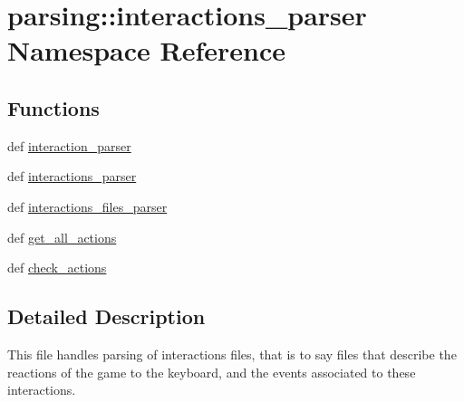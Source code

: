 \hypertarget{namespaceparsing_1_1interactions__parser}{\section{parsing\-:\-:interactions\-\_\-parser \-Namespace \-Reference}
\label{namespaceparsing_1_1interactions__parser}
}
\subsection*{\-Functions}
\begin{DoxyCompactItemize}
\item 
def \hyperlink{namespaceparsing_1_1interactions__parser_af105d3c1a03a8fd47a54b441523a01b2}{interaction\-\_\-parser}
\item 
def \hyperlink{namespaceparsing_1_1interactions__parser_a22116bba4ecbecceb5a463fb48eecfcb}{interactions\-\_\-parser}
\item 
def \hyperlink{namespaceparsing_1_1interactions__parser_a429a7f56c0d5ef9142a7f53eadde5730}{interactions\-\_\-files\-\_\-parser}
\item 
def \hyperlink{namespaceparsing_1_1interactions__parser_aa24df4f28ffc354917bdf70e03a7cbaf}{get\-\_\-all\-\_\-actions}
\item 
def \hyperlink{namespaceparsing_1_1interactions__parser_a71f05fcdcecb4037efa1ea4d0362a2b1}{check\-\_\-actions}
\end{DoxyCompactItemize}


\subsection{\-Detailed \-Description}
\begin{DoxyVerb}
This file handles parsing of interactions files, that is to say files that
describe the reactions of the game to the keyboard, and the events associated to
these interactions.
\end{DoxyVerb}
 

